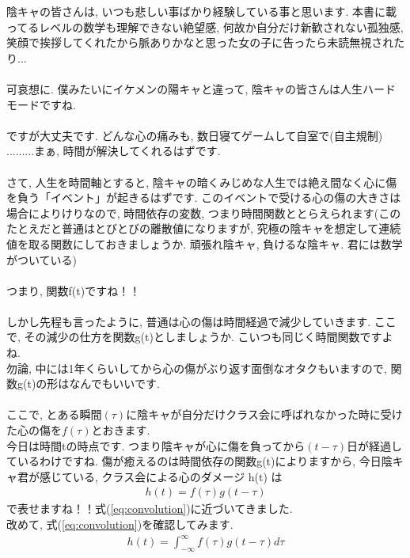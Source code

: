 \documentclass[11pt,a4paper]{jreport}
\begin{document}
陰キャの皆さんは, いつも悲しい事ばかり経験している事と思います. 本書に載ってるレベルの数学も理解できない絶望感, 何故か自分だけ新歓されない孤独感, 笑顔で挨拶してくれたから脈ありかなと思った女の子に告ったら未読無視されたり...\\
\\
可哀想に. 僕みたいにイケメンの陽キャと違って, 陰キャの皆さんは人生ハードモードですね.\\
\\
ですが大丈夫です. どんな心の痛みも, 数日寝てゲームして自室で(自主規制)
.........まぁ, 時間が解決してくれるはずです. \\
\\
さて, 人生を時間軸とすると, 陰キャの暗くみじめな人生では絶え間なく心に傷を負う「イベント」が起きるはずです. このイベントで受ける心の傷の大きさは場合によりけりなので, 時間依存の変数, つまり時間関数ととらえられます(このたとえだと普通はとびとびの離散値になりますが, 究極の陰キャを想定して連続値を取る関数にしておきましょうか. 頑張れ陰キャ, 負けるな陰キャ. 君には数学がついている)\\
\\
つまり, 関数f(t)ですね！！\\
\\
しかし先程も言ったように, 普通は心の傷は時間経過で減少していきます. ここで, その減少の仕方を関数g(t)としましょうか. こいつも同じく時間関数ですよね.\\
勿論, 中には1年くらいしてから心の傷がぶり返す面倒なオタクもいますので, 関数g(t)の形はなんでもいいです.\\
\\
ここで, とある瞬間$(\tau)$に陰キャが自分だけクラス会に呼ばれなかった時に受けた心の傷を$f(\tau)$とおきます.\\
今日は時間tの時点です. つまり陰キャが心に傷を負ってから$(t-\tau)$日が経過しているわけですね. 傷が癒えるのは時間依存の関数g(t)によりますから, 今日陰キャ君が感じている, クラス会による心のダメージ h(t) は
\begin{eqnarray}
\label{eq:inkya_otu}
h(t) = f(\tau) g(t-\tau)
\end{eqnarray}
で表せますね！！式(\ref{eq:convolution})に近づいてきました. \\
改めて, 式(\ref{eq:convolution})を確認してみます.
\begin{eqnarray}
h(t) = \int^{\infty}_{-\infty} f(\tau) g(t - \tau) d\tau
\end{eqnarray}
\end{document}
